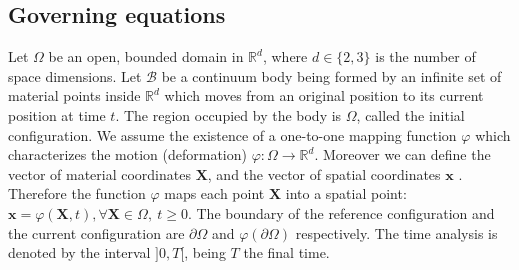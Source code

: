 \documentclass[11pt,english]{article}
\def\InitialDomain{\Omega}
\begin{document}
\subsection{Governing equations}
    Let $\InitialDomain$ be an open, bounded domain in $\mathbb{R}^{d}$, where $d\in \{2,3\}$ is the number of space dimensions. Let $\mathcal{B}$ be a continuum body being formed by an infinite set of material points inside $\mathbb{R}^d$ which moves from an original position to its current position at time $t$. The region occupied by the body is $\InitialDomain$, called the initial configuration.
    We assume the existence of a one-to-one mapping function $\varphi$ which characterizes the motion (deformation) $\varphi: \InitialDomain \longrightarrow \mathbb{R}^d $. Moreover we can define the vector of material coordinates $\mathbf{X}$, and the  vector of spatial coordinates  $\mathbf{x}$ . 
   Therefore the function $\varphi$ maps each point $\mathbf{X}$ into a spatial point: 
   $\mathbf{x}=\varphi \left(\mathbf{X},t\right), \forall \mathbf{X} \in \InitialDomain, \ t \geq 0$.
    The boundary of the reference configuration and the current configuration are $\partial \InitialDomain$ and $\varphi(\partial \InitialDomain)$ respectively.
    The time analysis is denoted by the interval $]0,T[$, being $T$ the final time.
    
\end{document}
